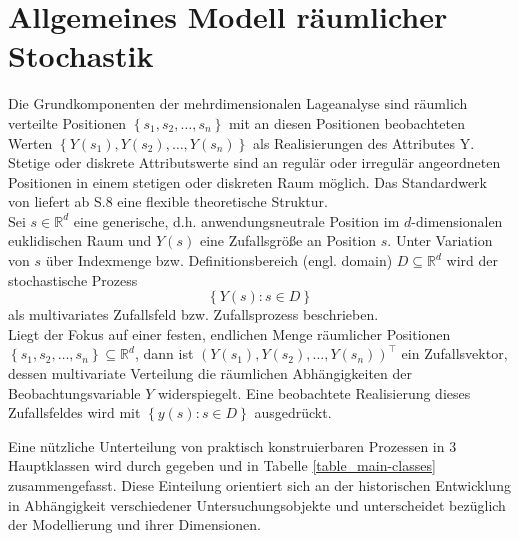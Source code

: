 \section{Allgemeines Modell räumlicher Stochastik}
\label{sec:generalmodel}

Die Grundkomponenten der mehrdimensionalen Lageanalyse sind räumlich verteilte Positionen 
$\left\{ s_1 , s_2 ,\ldots , s_n \right\}$ mit an diesen Positionen 
beobachteten Werten $\left\{ Y(s_1),Y(s_2),\ldots,Y(s_n) \right\}$ als Realisierungen des Attributes Y. 
Stetige oder diskrete Attributswerte sind 
an regulär oder irregulär angeordneten Positionen in einem stetigen oder diskreten Raum möglich. 
Das Standardwerk von \cite{cressie_statistics_1993} liefert ab S.8 eine flexible 
theoretische Struktur. \\

Sei $s \in \mathds{R}^d $ eine generische, d.h. anwendungsneutrale Position 
im $d$-dimensionalen euklidischen Raum 
und $Y(s)$ eine Zufallsgröße an Position $s$. 
Unter Variation von $s$ über Indexmenge bzw. Definitionsbereich (engl. domain) $D \subseteq \mathds{R}^d$ 
wird der stochastische Prozess 
\begin{equation*}
    \left\{ Y(s):s \in D \right\}
\end{equation*}
als multivariates Zufallsfeld bzw. Zufallsprozess beschrieben.\\

Liegt der Fokus auf einer festen, endlichen Menge räumlicher 
Positionen $ \left\{  s_1 , s_2 ,\ldots , s_n \right\} \subseteq \mathds{R}^d$, 
dann ist $ \left( Y(s_1),Y(s_2),\ldots,Y(s_n) \right)^{\top} $ ein Zufallsvektor, 
dessen multivariate Verteilung die räumlichen Abhängigkeiten der Beobachtungsvariable $Y$ widerspiegelt. 
Eine beobachtete Realisierung dieses Zufallsfeldes wird mit $\left\{ y(s):s \in D \right\}$ ausgedrückt.

Eine nützliche Unterteilung von praktisch konstruierbaren Prozessen in 3 Hauptklassen 
wird durch \cite{cressie_statistics_1993} gegeben und in 
Tabelle \ref{table_main-classes} zusammengefasst. 
Diese Einteilung orientiert sich an der historischen 
Entwicklung in Abhängigkeit verschiedener Untersuchungsobjekte und unterscheidet bezüglich 
der Modellierung und ihrer Dimensionen.

